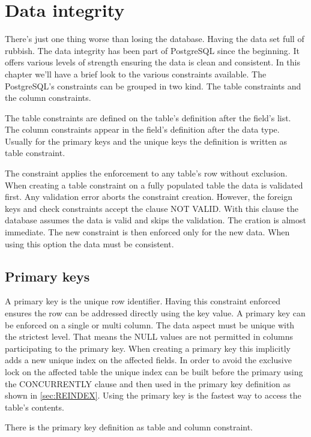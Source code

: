 \chapter{Data integrity}
\label{cha:DATAINT}
There's just one thing worse than losing the database. Having the data set full of rubbish. The 
data integrity has been part of PostgreSQL since the beginning. It offers various levels of 
strength ensuring the data is clean and consistent. In this chapter we'll have a brief look to the 
various constraints available. The PostgreSQL's constraints can be grouped in two kind. The table 
constraints and the column constraints. 

The table constraints are defined on the table's definition after the field's list. The column 
constraints appear in the field's definition after the data type. Usually for the primary keys and 
the unique keys the definition is  written as table constraint. 

The constraint applies the enforcement to any table's row without exclusion. When creating a table 
constraint on a fully populated table the data is validated first. Any validation error aborts the 
constraint creation. However, the foreign keys and check constraints accept the clause NOT VALID. 
With this clause the database  assumes the data is valid and skips the validation. The cration is 
almost immediate. The new constraint is then enforced only for the new data. When using this 
option  the data must be consistent.

\section{Primary keys} 
A primary key is the unique row identifier. Having this constraint enforced ensures the row can be 
addressed directly using the key value. A primary key can be enforced on a single or multi column. 
The data aspect must be unique with the strictest level. That means the NULL values are not 
permitted in columns participating to the primary key. When creating a primary key this 
implicitly adds a new unique index on the affected fields. In order to avoid the exclusive lock 
on the affected  table the unique index can be built before the primary using the CONCURRENTLY 
clause and then used in the primary key definition as shown in \ref{sec:REINDEX}. Using the primary 
key is the fastest way to access the table's contents.\newline

There is the primary key definition as table and column constraint.\newpage

